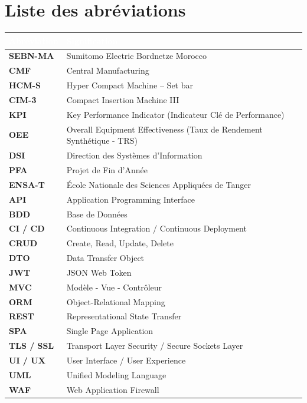 \chapter*{Liste des abréviations}

\vspace{0.5cm}


\noindent
\begin{tabularx}{\textwidth}{>{\bfseries}p{3cm} X}
    \toprule
    \rowcolor{headerblue} 
    \textcolor{white}{\textbf{Abréviation}} & \textcolor{white}{\textbf{Signification}} \\
    \midrule
    
    SEBN-MA   & Sumitomo Electric Bordnetze Morocco \\
    CMF       & Central Manufacturing \\
    HCM-S     & Hyper Compact Machine – Set bar \\
    CIM-3     & Compact Insertion Machine III \\
    KPI       & Key Performance Indicator (Indicateur Clé de Performance) \\
    OEE       & Overall Equipment Effectiveness (Taux de Rendement Synthétique - TRS) \\
    DSI       & Direction des Systèmes d'Information \\
    
    PFA       & Projet de Fin d'Année \\
    ENSA-T    & École Nationale des Sciences Appliquées de Tanger \\
    
    API       & Application Programming Interface \\
    BDD       & Base de Données \\
    CI / CD   & Continuous Integration / Continuous Deployment \\
    CRUD      & Create, Read, Update, Delete \\
    DTO       & Data Transfer Object \\
    JWT       & JSON Web Token \\
    MVC       & Modèle - Vue - Contrôleur \\
    ORM       & Object-Relational Mapping \\
    REST      & Representational State Transfer \\
    SPA       & Single Page Application \\
    TLS / SSL & Transport Layer Security / Secure Sockets Layer \\
    UI / UX   & User Interface / User Experience \\
    UML       & Unified Modeling Language \\
    WAF       & Web Application Firewall \\
    
    \bottomrule
\end{tabularx}